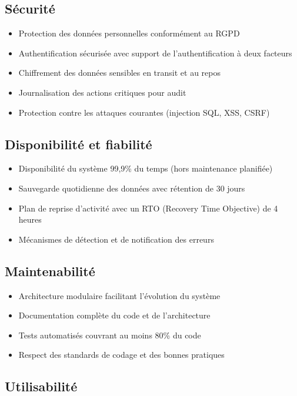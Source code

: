 \documentclass[12pt,a4paper]{report}
\begin{document}
\subsection{Sécurité}

\begin{itemize}
\item Protection des données personnelles conformément au RGPD
\item Authentification sécurisée avec support de l'authentification à deux facteurs
\item Chiffrement des données sensibles en transit et au repos
\item Journalisation des actions critiques pour audit
\item Protection contre les attaques courantes (injection SQL, XSS, CSRF)
\end{itemize}

\subsection{Disponibilité et fiabilité}

\begin{itemize}
\item Disponibilité du système 99,9\% du temps (hors maintenance planifiée)
\item Sauvegarde quotidienne des données avec rétention de 30 jours
\item Plan de reprise d'activité avec un RTO (Recovery Time Objective) de 4 heures
\item Mécanismes de détection et de notification des erreurs
\end{itemize}

\subsection{Maintenabilité}

\begin{itemize}
\item Architecture modulaire facilitant l'évolution du système
\item Documentation complète du code et de l'architecture
\item Tests automatisés couvrant au moins 80\% du code
\item Respect des standards de codage et des bonnes pratiques
\end{itemize}

\subsection{Utilisabilité}
\end{document}
